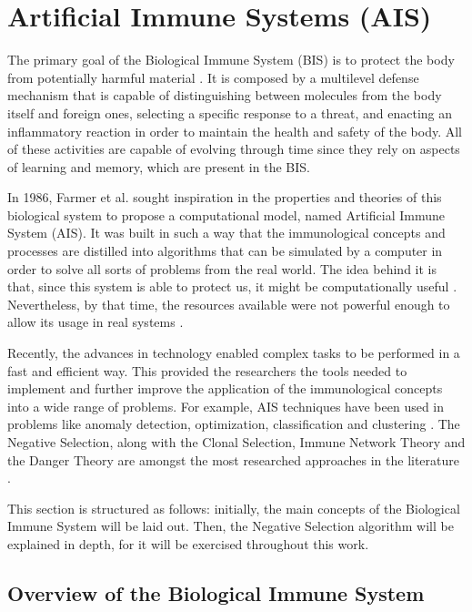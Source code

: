 \section{Artificial Immune Systems (AIS)} \label{sec:bgais}

The primary goal of the Biological Immune System (BIS) is to protect the body from potentially harmful material \cite{AISSOA2015}. It is composed by a multilevel defense mechanism that is capable of distinguishing between molecules from the body itself and foreign ones, selecting a specific response to a threat, and enacting an inflammatory reaction in order to maintain the health and safety of the body. All of these activities are capable of evolving through time since they rely on aspects of learning and memory, which are present in the BIS.

In 1986, Farmer et al. \cite{ImmuneSysAdapML1986} sought inspiration in the properties and theories of this biological system to propose a computational model, named Artificial Immune System (AIS). It was built in such a way that the immunological concepts and processes are distilled into algorithms that can be simulated by a computer in order to solve all sorts of problems from the real world. The idea behind it is that, since this system is able to protect us, it might be computationally useful \cite{EvaluateAIS2005}. Nevertheless, by that time, the resources available were not powerful enough to allow its usage in real systems \cite{AdaptiveImmunitySAS2021}.

Recently, the advances in technology enabled complex tasks to be performed in a fast and efficient way. This provided the researchers the tools needed to implement and further improve the application of the immunological concepts into a wide range of problems. For example, AIS techniques have been used in problems like anomaly detection, optimization, classification and clustering \cite{AISSOA2015}. The Negative Selection, along with the Clonal Selection, Immune Network Theory and the Danger Theory are amongst the most researched approaches in the literature \cite{NSAResearch2021}.

This section is structured as follows: initially, the main concepts of the Biological Immune System will be laid out. Then, the Negative Selection algorithm will be explained in depth, for it will be exercised throughout this work.

\subsection{Overview of the Biological Immune System}

